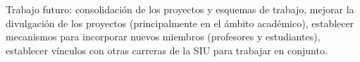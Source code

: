 \documentclass[conference]{IEEEtran}
\begin{document}




Trabajo futuro: consolidación de los proyectos y esquemas de trabajo, mejorar la divulgación de los proyectos (principalmente en el ámbito académico), establecer mecanismos para incorporar nuevos miembros (profesores y estudiantes), establecer vínculos con otras carreras de la SIU para trabajar en conjunto. 





%






\end{document}
